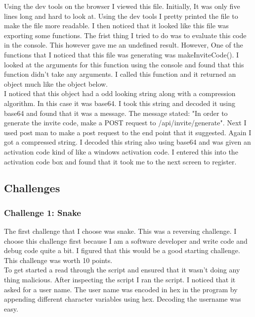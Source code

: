 \documentclass[letterpaper, onecolumn,10pt]{IEEEtran}
\begin{document}
		Using the dev tools on the browser I viewed this file. Initially, It was only five lines long and hard to look at. Using the dev tools I pretty printed the file to make the file more readable. I then noticed that it looked like this file was exporting some functions. The frist thing I tried to do was to evaluate this code in the console. This however gave me an undefined result. However, One of the functions that I noticed that this file was generating was makeInviteCode(). I looked at the arguments for this function using the console and found that this function didn't take any arguments. I called this function and it returned an object much like the object below.\\
		
		I noticed that this object had a odd looking string along with a compression algorithm. In this case it was base64. I took this string and decoded it using base64 and found that it was a message. The message stated: "In order to generate the invite code, make a POST request to /api/invite/generate". Next I used post man to make a post request to the end point that it suggested. Again I got a compressed string. I decoded this string also using base64 and was given an activation code kind of like a windows activation code. I entered this into the activation code box and found that it took me to the next screen to register.\\
		
	    \subsection{Challenges}
	        \subsubsection{Challenge 1: Snake}
	        The first challenge that I choose was snake. This was a reversing challenge. I choose this challenge first because I am a software developer and write code and debug code quite a bit. I figured that this would be a good starting challenge. This challenge was worth 10 points.\\
	        
	        To get started a read through the script and ensured that it wasn't doing any thing malicious. After inspecting the script I ran the script. I noticed that it asked for a user name. The user name was encoded in hex in the program by appending different character variables using hex. Decoding the username was easy.\\
	        
\end{document}

